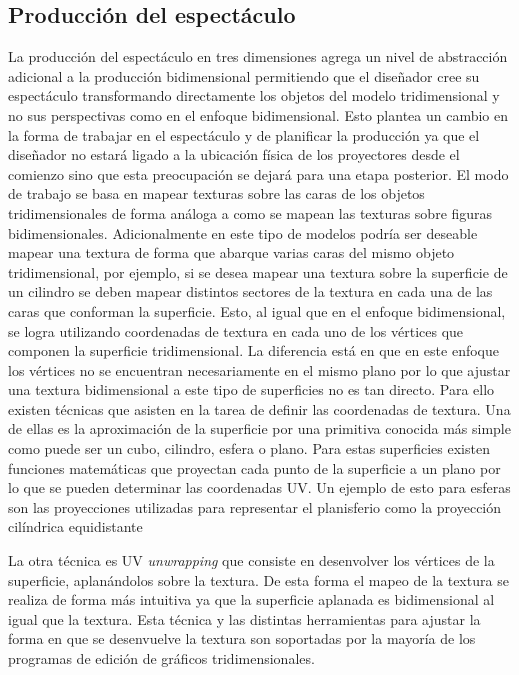\subsection{Producción del espectáculo}
La producción del espectáculo en tres dimensiones agrega un nivel de abstracción adicional a la producción bidimensional permitiendo que el diseñador cree su espectáculo transformando directamente los objetos del modelo tridimensional y no sus perspectivas como en el enfoque bidimensional.
Esto plantea un cambio en la forma de trabajar en el espectáculo y de planificar la producción ya que el diseñador no estará ligado a la ubicación física de los proyectores desde el comienzo sino que esta preocupación se dejará para una etapa posterior.
El modo de trabajo se basa en mapear texturas sobre las caras de los objetos tridimensionales de forma análoga a como se mapean las texturas sobre figuras bidimensionales. Adicionalmente en este tipo de modelos podría ser deseable mapear una textura de forma que abarque varias caras del mismo objeto tridimensional, por ejemplo, si se desea mapear una textura sobre la superficie de un cilindro se deben mapear distintos sectores de la textura en cada una de las caras que conforman la superficie.
Esto, al igual que en el enfoque bidimensional, se logra utilizando coordenadas de textura en cada uno de los vértices que componen la superficie tridimensional. La diferencia está en que en este enfoque los vértices no se encuentran necesariamente en el mismo plano por lo que ajustar una textura bidimensional a este tipo de superficies no es tan directo. Para ello existen técnicas que asisten en la tarea de definir las coordenadas de textura. Una de ellas es la aproximación de la superficie por una primitiva conocida más simple como puede ser un cubo, cilindro, esfera o plano. Para estas superficies existen funciones matemáticas que proyectan cada punto de la superficie a un plano por lo que se pueden determinar las coordenadas UV. Un ejemplo de esto para esferas son las proyecciones utilizadas para representar el planisferio como la proyección cilíndrica equidistante \cite{flatteningTheEarth}

La otra técnica es UV \emph{unwrapping} que consiste en desenvolver los vértices de la superficie, aplanándolos sobre la textura. De esta forma el mapeo de la textura se realiza de forma más intuitiva ya que la superficie aplanada es bidimensional al igual que la textura. Esta técnica y las distintas herramientas para ajustar la forma en que se desenvuelve la textura son soportadas por la mayoría de los programas de edición de gráficos tridimensionales.


